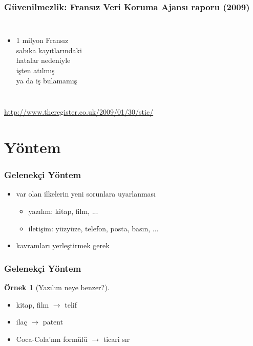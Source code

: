 \documentclass[dvipsnames]{beamer}
\theoremstyle{definition}
\theoremstyle{example}
\newtheorem{ornek}[theorem]{Örnek}
\theoremstyle{plain}
\begin{document}
\begin{frame}
  \frametitle{Güvenilmezlik: Fransız Veri Koruma Ajansı raporu (2009)}

  \begin{columns}

    \begin{itemize}
      \item 1 milyon Fransız\\
        sabıka kayıtlarındaki\\
        hatalar nedeniyle\\
        işten atılmış\\
        ya da iş bulamamış
    \end{itemize}
  \end{columns}

  \medskip
  \tiny{\url{http://www.theregister.co.uk/2009/01/30/stic/}}
\end{frame}

\section{Yöntem}

\begin{frame}
  \frametitle{Gelenekçi Yöntem}

  \begin{itemize}
    \item var olan ilkelerin yeni sorunlara uyarlanması
    \begin{itemize}
      \item yazılım: kitap, film, ...
      \item iletişim: yüzyüze, telefon, posta, basın, ...
    \end{itemize}

    \bigskip
    \item kavramları yerleştirmek gerek
  \end{itemize}
\end{frame}

\begin{frame}
  \frametitle{Gelenekçi Yöntem}

  \begin{ornek}[Yazılım neye benzer?]
    \begin{itemize}
      \item kitap, film $\rightarrow$ telif
      \item ilaç $\rightarrow$ patent
      \item Coca-Cola'nın formülü $\rightarrow$ ticari sır
    \end{itemize}
  \end{ornek}
\end{frame}
\end{document}
